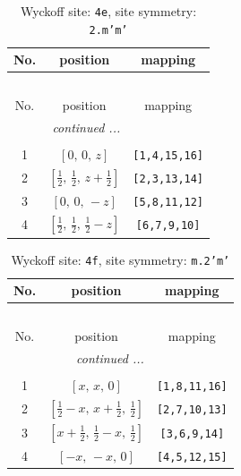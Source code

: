 \documentclass[fleqn,8pt]{jsarticle}
\begin{document}
\renewcommand{\arraystretch}{1.2}
\begin{longtable}{ccc}
\caption{Wyckoff site: {\tt 4e}, site symmetry: {\tt 2.m'm'}}
 \\
 \hline \hline
No. & position & mapping \\ \hline \endfirsthead

\multicolumn{2}{l}{\tablename\ \thetable{}} \\
 \hline \hline
No. & position & mapping \\ \hline \endhead

 \hline \hline
\multicolumn{2}{r}{\footnotesize\it continued ...} \\ \endfoot

 \hline \hline
\multicolumn{2}{r}{} \\ \endlastfoot

1 & $\left[ 0,\, 0,\, z \right]$ & {\tt [1,4,15,16]} \\ \hline
2 & $\left[ \frac{1}{2},\, \frac{1}{2},\, z + \frac{1}{2} \right]$ & {\tt [2,3,13,14]} \\ \hline
3 & $\left[ 0,\, 0,\, - z \right]$ & {\tt [5,8,11,12]} \\ \hline
4 & $\left[ \frac{1}{2},\, \frac{1}{2},\, \frac{1}{2} - z \right]$ & {\tt [6,7,9,10]} \\
\end{longtable}
\renewcommand{\arraystretch}{1.2}
\begin{longtable}{ccc}
\caption{Wyckoff site: {\tt 4f}, site symmetry: {\tt m.2'm'}}
 \\
 \hline \hline
No. & position & mapping \\ \hline \endfirsthead

\multicolumn{2}{l}{\tablename\ \thetable{}} \\
 \hline \hline
No. & position & mapping \\ \hline \endhead

 \hline \hline
\multicolumn{2}{r}{\footnotesize\it continued ...} \\ \endfoot

 \hline \hline
\multicolumn{2}{r}{} \\ \endlastfoot

1 & $\left[ x,\, x,\, 0 \right]$ & {\tt [1,8,11,16]} \\ \hline
2 & $\left[ \frac{1}{2} - x,\, x + \frac{1}{2},\, \frac{1}{2} \right]$ & {\tt [2,7,10,13]} \\ \hline
3 & $\left[ x + \frac{1}{2},\, \frac{1}{2} - x,\, \frac{1}{2} \right]$ & {\tt [3,6,9,14]} \\ \hline
4 & $\left[ - x,\, - x,\, 0 \right]$ & {\tt [4,5,12,15]} \\
\end{longtable}
\end{document}
